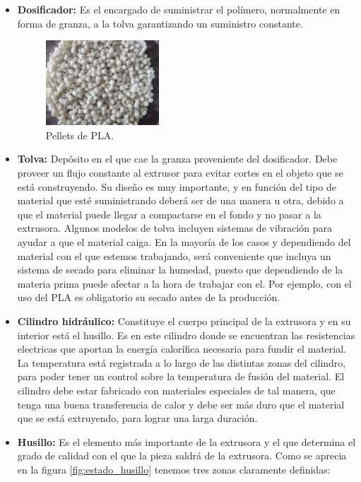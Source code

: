 \begin{itemize}
    \item \textbf{Dosificador:} Es el encargado de suministrar el polímero, normalmente en forma de granza, a la tolva garantizando un suministro constante. 
     \begin{figure}[H]
        \centering
        \includegraphics[width=0.4\textwidth]{images/PLA-Pellets.jpg}
        \caption[Pellets de PLA]{Pellets de PLA.}
        \label{fig:Pellets_PLA}
    \end{figure}
    \item \textbf{Tolva:} Depósito en el que cae la granza proveniente del dosificador. Debe proveer un flujo constante al extrusor para evitar cortes en el objeto que se está construyendo. Su diseño es muy importante, y en función del tipo de material que esté suministrando deberá ser de una manera u otra, debido a que el material puede llegar a compactarse en el fondo y no pasar a la extrusora. Algunos modelos de tolva incluyen sistemas de vibración para ayudar a que el material caiga. En la mayoría de los casos y dependiendo del material con el que estemos trabajando, será conveniente que incluya un sistema de secado para eliminar la humedad, puesto que dependiendo de la materia prima puede afectar a la hora de trabajar con el. Por ejemplo, con el uso del PLA es obligatorio su secado antes de la producción.
    \item \textbf{Cilindro hidráulico:} Constituye el cuerpo principal de la extrusora y en su interior está el husillo. Es en este cilindro donde se encuentran las resistencias electricas que aportan la energía calorífica necesaria para fundir el material. La temperatura está registrada a lo largo de las distintas zonas del cilindro, para poder tener un control sobre la temperatura de fusión del material. El cilindro debe estar fabricado con materiales especiales de tal manera, que tenga una buena transferencia de calor y debe ser más duro que el material que se está extruyendo, para lograr una larga duración.
    \item \textbf{Husillo:} Es el elemento más importante de la extrusora y el que determina el grado de calidad con el que la pieza saldrá de la extrusora. Como se aprecia en la figura \ref{fig:estado_husillo} tenemos tres zonas claramente definidas:


\end{itemize}
